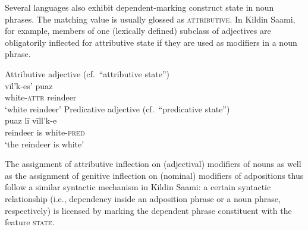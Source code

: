 Several languages also exhibit dependent\hyp{}marking construct state in noun phrases. The matching value is usually glossed as \textsc{attributive}. In Kildin Saami, for example, members of one (lexically defined) subclass of adjectives are obligatorily inflected for attributive state if they are used as modifiers in a noun phrase.
\begin{exe}
\ex
{}
\label{state np kildin}
\begin{xlist}
\ex	
{\rm Attributive adjective (cf.~“attributive state”)}\\
\gll 	vīl'k-es'		puaz\\
	white-\textsc{attr}	reindeer\\
\glt 	‘white reindeer’
\ex	
{\rm Predicative adjective (cf.~“predicative state”)}\\
\gll	puaz lī vīll'k-e\\
	reindeer is white-\textsc{pred}\\
\glt	‘the reindeer is white’
\end{xlist}
\end{exe}

The assignment of attributive inflection on (adjectival) modifiers of nouns as well as the assignment of genitive inflection on (nominal) modifiers of adpositions thus follow a similar syntactic mechanism in Kildin Saami: a certain syntactic relationship (i.e., dependency inside an adposition phrase or a noun phrase, respectively) is licensed by marking the dependent phrase constituent with the feature \textsc{state}.

